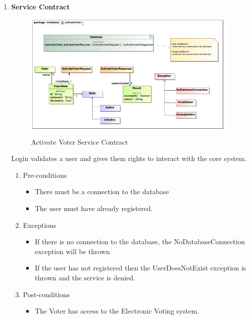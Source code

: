 \begin{enumerate}
		\begin{enumerate}
			\item \textbf{Service Contract}
			\begin{figure}[H]
				\centering
				\includegraphics[width=0.75\linewidth]{../Images/Database/ServiceContracts/ActivateVoter_ServiceContract.png}
				\caption{Activate Voter Service Contract}
			\end{figure}
			
			Login validates a user and gives them rights to interact with the core system. 
			\newline
			
			\begin{enumerate}
				\item Pre-conditions
				\begin{itemize}
					\item There must be a connection to the database
					\item The user must have already registered. 
				\end{itemize}
				
				\item Exceptions
				\begin{itemize}
						\item If there is no connection to the database, the NoDatabaseConnection exception will be thrown
						\item If the user has not registered then the UserDoesNotExist exception is thrown and the service is denied. 
				\end{itemize}
				
				\item Post-conditions
				\begin{itemize}
					\item The Voter has access to the Electronic Voting system.
				\end{itemize}
			\end{enumerate}
			

\end{enumerate}
\end{enumerate}
